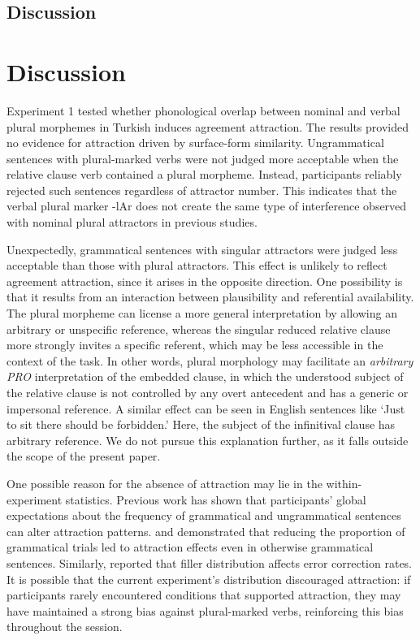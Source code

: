 \documentclass[
  authoryear,
  3p]{elsarticle}
\begin{document}
\subsection{Discussion}\label{discussion}

\section{Discussion}

Experiment 1 tested whether phonological overlap between nominal and
verbal plural morphemes in Turkish induces agreement attraction. The
results provided no evidence for attraction driven by surface-form
similarity. Ungrammatical sentences with plural-marked verbs were not
judged more acceptable when the relative clause verb contained a plural
morpheme. Instead, participants reliably rejected such sentences
regardless of attractor number. This indicates that the verbal plural
marker -lAr does not create the same type of interference observed with
nominal plural attractors in previous studies.

Unexpectedly, grammatical sentences with singular attractors were judged
less acceptable than those with plural attractors. This effect is
unlikely to reflect agreement attraction, since it arises in the
opposite direction. One possibility is that it results from an
interaction between plausibility and referential availability. The
plural morpheme can license a more general interpretation by allowing an
arbitrary or unspecific reference, whereas the singular reduced relative
clause more strongly invites a specific referent, which may be less
accessible in the context of the task. In other words, plural morphology
may facilitate an \emph{arbitrary PRO} interpretation of the embedded
clause, in which the understood subject of the relative clause is not
controlled by any overt antecedent and has a generic or impersonal
reference. A similar effect can be seen in English sentences like `Just
to sit there should be forbidden.' Here, the subject of the infinitival
clause has arbitrary reference. We do not pursue this explanation
further, as it falls outside the scope of the present paper.

One possible reason for the absence of attraction may lie in the
within-experiment statistics. Previous work has shown that participants'
global expectations about the frequency of grammatical and ungrammatical
sentences can alter attraction patterns. \citet{HammerlyEtAl2019} and
\citet{Turk2022} demonstrated that reducing the proportion of
grammatical trials led to attraction effects even in otherwise
grammatical sentences. Similarly, \citet{ArehalliWittenberg2021}
reported that filler distribution affects error correction rates. It is
possible that the current experiment's distribution discouraged
attraction: if participants rarely encountered conditions that supported
attraction, they may have maintained a strong bias against plural-marked
verbs, reinforcing this bias throughout the session.
\end{document}
